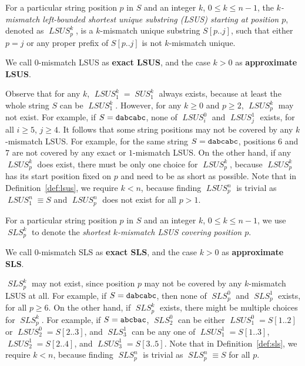\documentclass[11pt]{llncs}
\DeclareMathOperator{\sus}{\mathit{SUS}}
\DeclareMathOperator{\lsus}{\mathit{LSUS}}
\DeclareMathOperator{\sls}{\mathit{SLS}}
\begin{document}
\begin{definition}
\label{def:lsus}
For a particular string position $p$ in $S$ and an integer $k$, $0\leq
k \leq n-1$, the \emph{$k$-mismatch left-bounded shortest unique
  substring (LSUS) starting at position $p$}, denoted as $\lsus_p^k$,
is a $k$-mismatch unique substring $S[p..  j]$, such that either $p=j$
or any proper prefix of $S[p.. j]$ is not $k$-mismatch unique.
\end{definition}

We call $0$-mismatch LSUS as {\bf exact
  LSUS}, and the case $k>0$ as {\bf approximate
  LSUS}.

Observe that for any $k$, $\lsus_1^k=\sus_1^k$ always exists, because
at least the whole string $S$ can be $\lsus_1^k$. However, for any
$k\geq 0$ and $p\geq 2$, $\lsus_p^k$ may not exist. For example, if
$S={\tt dabcabc}$, none of $\lsus_i^0$ and $\lsus_j^1$ exists, for all
$i\geq 5$, $j\geq 4$. It follows that some string positions may not be
covered by any $k$-mismatch LSUS. For example, for the same string
$S={\tt dabcabc}$, positions $6$ and $7$ are not covered by any exact
or $1$-mismatch LSUS. On the other hand, if any $\lsus_p^k$ does
exist, there must be only one choice for $\lsus_p^k$, because
$\lsus_p^k$ has its start position fixed on $p$ and need to be as
short as possible.
Note that in Definition~\ref{def:lsus}, we require $k < n$, because
finding $\lsus_p^n$ is trivial as $\lsus_1^n\equiv S$ and $\lsus_p^n$
does not exist for all $p>1$.  



\begin{definition}
\label{def:sls}
For a particular string position $p$ in $S$ and an integer $k$, $0\leq
k \leq n-1$, we use $\sls_p^k$ to denote the \emph{shortest $k$-mismatch LSUS 
covering position $p$}.
\end{definition}

We call $0$-mismatch SLS as {\bf exact
  SLS}, and the case $k>0$ as {\bf approximate
  SLS}.

$\sls_p^k$ may not exist, since position $p$ may not be covered by any
$k$-mismatch LSUS at all. For example, if $S={\tt dabcabc}$, then none
of $\sls_p^0$ and $\sls_p^1$ exists, for all $p\geq 6$.  On the other
hand, if $\sls_p^k$ exists, there might be multiple choices for
$\sls_p^k$.  For example, if $S={\tt abcbac}$, $\sls_2^0$ can be
either $\lsus_1^0=S[1..2]$ or $\lsus_2^0 = S[2..3]$, and $\sls_3^1$
can be any one of $\lsus_1^1=S[1..3]$, $\lsus_2^1=S[2..4]$, and
$\lsus_3^1=S[3..5]$.
Note that in Definition~\ref{def:sls}, we require $k < n$, because
finding $\sls_p^n$ is trivial as $\sls_p^n \equiv S$ for all $p$.
\end{document}
